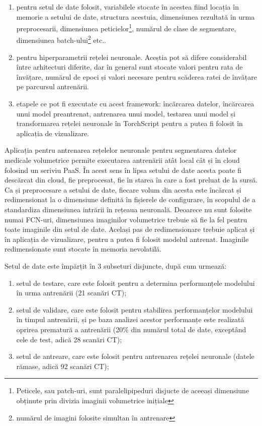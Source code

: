 \begin{enumerate}
    \item pentru setul de date folosit, variabilele stocate în acestea fiind locația în memorie a setului de date, structura acestuia, dimensiunea rezultată în urma preprocesarii, dimensiunea peticielor\footnote{Peticele, sau patch-uri, sunt paralelipipeduri disjucte de aceeași dimensiune obținute prin divizia imaginii volumetrice inițiale}, numărul de clase de segmentare, dimensiunea batch-ului\footnote{numărul de imagini folosite simultan în antrenare} etc..
    \item pentru hiperparametrii rețelei neuronale. Aceștia pot să difere considerabil între arhitecturi diferite, dar în general sunt stocate valori pentru rata de învățare, numărul de epoci și valori necesare pentru scăderea ratei de învățare pe parcursul antrenării.
    \item etapele ce pot fi executate cu acest framework: încărcarea datelor, încărcarea unui model preantrenat, antrenarea unui model, testarea unui model și transformarea rețelei neuronale în TorchScript pentru a putea fi folosit în aplicația de vizualizare.
\end{enumerate}

Aplicația pentru antrenarea rețelelor neuronale pentru segmentarea datelor medicale volumetrice permite executarea antrenării atât local cât și în cloud folosind un seriviu PaaS. În acest sens în lipsa setului de date acesta poate fi descărcat din cloud, fie preprocesat, fie în starea în care a fost preluat de la sursă. Ca și preprocesare a setului de date, fiecare volum din acesta este încărcat și redimensionat la o dimensiune definită în fișierele de configurare, în scopulul de a standardiza dimensiunea intrării în rețeaua neuronală. Deoarece nu sunt folosite numai FCN-uri, dimensiunea imaginilor volumetrice trebuie să fie la fel pentru toate imaginile din setul de date. Același pas de redimensionare trebuie aplicat și în aplicația de vizualizare, pentru a putea fi folosit modelul antrenat. Imaginile redimensionate sunt stocate în memoria nevolatilă.

Setul de date este împărțit în 3 subseturi disjuncte, după cum urmează:

\begin{enumerate}
    \item setul de testare, care este folosit pentru a determina performanțele modelului în urma antrenării (21 scanări CT);
    \item setul de validare, care este folosit pentru stabilirea performanțelor modelului în timpul antrenării, și pe baza analizei acestor performanțe este realizată oprirea prematură a antrenării (20\% din numărul total de date, exceptând cele de test, adică 28 scanări CT);
    \item setul de antreare, care este folosit pentru antrenarea rețelei neuronale (datele rămase, adică 92  scanări CT);
\end{enumerate}

